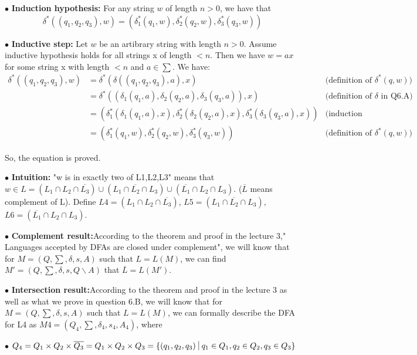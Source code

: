 \documentclass[12pt,a4paper]{article}
\newcommand{\question}[1]{\bigskip\noindent{\textbf{Q{#1} solution}}}
\begin{document}
$\bullet$ \textbf{Induction hypothesis:} For any string $w$ of length $n > 0$, we have that
\begin{equation*}
  \delta^*((q_1,q_2,q_3),w) = (\delta_1^*(q_1,w), \delta_2^*(q_2,w), \delta_3^*(q_3,w))
\end{equation*}

$\bullet$ \textbf{Inductive step:} Let $w$ be an artibrary string with length $n > 0$. Assume inductive hypothesis holds for all strings x of length $< n$. Then we have $w = ax$ for some string x with length $< n$ and $a \in \sum$. We have:
\begin{align*}
  \delta^*((q_1,q_2,q_3),w) &= \delta^*(\delta((q_1,q_2,q_3), a), x) &\mbox{(definition of $\delta^*(q,w)$) }\\
      &= \delta^*((\delta_1(q_1,a), \delta_2(q_2,a), \delta_3(q_3,a)), x) &\mbox{(definition of $\delta$ in Q6.A)}\\
      &= (\delta_1^*(\delta_1(q_1,a), x),\delta_2^*(\delta_2(q_2,a), x),\delta_3^*(\delta_3(q_3,a), x)) &\mbox{(induction hypothesis)}\\
      &= (\delta_1^*(q_1,w), \delta_2^*(q_2,w), \delta_3^*(q_3,w)) &\mbox{(definition of $\delta^*(q,w)$) }
\end{align*}

So, the equation is proved.


\question{6.C}

	$\bullet$ \textbf{Intuition:} "w is in exactly two of {L1,L2,L3}" means that $w \in L = (L_1 \cap L_2 \cap \overline{L_3}) \cup ( L_1 \cap \overline{L_2} \cap L_3) \cup (\overline{L_1} \cap L_2 \cap L_3)$. ($\overline{L}$ means complement of L). Define $L4=(L_1 \cap L_2 \cap \overline{L_3})$, $L5=( L_1 \cap \overline{L_2} \cap L_3)$, $L6 = (\overline{L_1} \cap L_2 \cap L_3)$.


	$\bullet$ \textbf{Complement result:}According to the theorem and proof in the lecture 3," Languages accepted by DFAs are closed under complement", we will know that for $M = (Q,\sum,\delta,s,A)$ such that $L=L(M)$, we can find $M' = (Q,\sum,\delta,s,Q \backslash A)$ that $\overline{L}=L(M')$. 


	$\bullet$ \textbf{Intersection result:}According to the theorem and proof in the lecture 3 as well as what we prove in question 6.B, we will know that for $M = (Q,\sum,\delta,s,A)$ such that $L=L(M)$, we can formally describe the DFA for L4 as  $M4 = (Q_{4},\sum,\delta_{4},s_{4},A_{4})$, where

	$\bullet$ $Q_4 = Q_1 \times Q_2 \times \overline{Q_3} =  Q_1 \times Q_2 \times Q_3 =\{(q_1,q_2,q_3)\ \vline\ q_1 \in Q_1, q_2 \in Q_2, q_3 \in Q_3\}$
\end{document}
